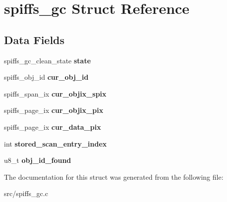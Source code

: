\hypertarget{structspiffs__gc}{}\section{spiffs\+\_\+gc Struct Reference}
\label{structspiffs__gc}
\subsection*{Data Fields}
\begin{DoxyCompactItemize}
\item 
\mbox{\label{structspiffs__gc_acad948885807fb1c3ea2984a1226c605}} 
spiffs\+\_\+gc\+\_\+clean\+\_\+state {\bfseries state}
\item 
\mbox{\label{structspiffs__gc_a5ceb2a4237d5656d2a13eb0522c1d52a}} 
spiffs\+\_\+obj\+\_\+id {\bfseries cur\+\_\+obj\+\_\+id}
\item 
\mbox{\label{structspiffs__gc_a322c5179dc6edb869a20820796a75626}} 
spiffs\+\_\+span\+\_\+ix {\bfseries cur\+\_\+objix\+\_\+spix}
\item 
\mbox{\label{structspiffs__gc_a233b84d5a3761bead2359c77e963e856}} 
spiffs\+\_\+page\+\_\+ix {\bfseries cur\+\_\+objix\+\_\+pix}
\item 
\mbox{\label{structspiffs__gc_ad0c61b2be67f7a13baa40b714b44984f}} 
spiffs\+\_\+page\+\_\+ix {\bfseries cur\+\_\+data\+\_\+pix}
\item 
\mbox{\label{structspiffs__gc_ad126f12ddd74c2c933ff546531750252}} 
int {\bfseries stored\+\_\+scan\+\_\+entry\+\_\+index}
\item 
\mbox{\label{structspiffs__gc_a45a1822bfd5b4252873ed57af1ab667a}} 
u8\+\_\+t {\bfseries obj\+\_\+id\+\_\+found}
\end{DoxyCompactItemize}


The documentation for this struct was generated from the following file\+:\begin{DoxyCompactItemize}
\item 
src/spiffs\+\_\+gc.\+c\end{DoxyCompactItemize}
